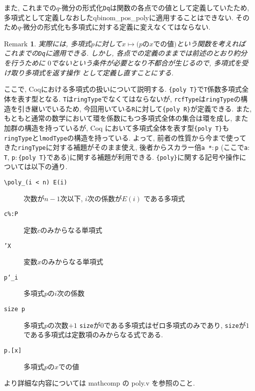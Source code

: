 \documentclass[11pt]{jsreport}
\theoremstyle{mystyle}
\newtheorem{rmk}[df]{$\textrm{Remark}$}
\newcommand{\brmk}{\begin{rmk}}
\newcommand{\ermk}{\end{rmk}}
\newcommand{\0}{\textbf{0}}
\begin{document}
また, これまでの$q$-微分の形式化{\tt Dq}は関数の各点での値として定義していたため, 多項式として定義しなおした{qbinom\_pos\_poly}に適用することはできない. そのため$q$-微分の形式化も多項式に対する定義に変えなくてはならない. 
\brmk
  実際には, 多項式$p$に対して$x \mapsto \text{($p$の$x$での値)}$という関数を考えれば
  これまでの{\tt Dq}に適用できる. しかし, 各点での定義のままでは前述のとおり約分を行うために
  $0$でないという条件が必要となり不都合が生じるので, 多項式を受け取り多項式を返す操作
  として定義し直すことにする. 
\ermk
ここで, Coqにおける多項式の扱いについて説明する. 
{\tt \{poly T\}}で{\tt T}係数多項式全体を表す型となる. {\tt T}は{\tt ringType}でなくてはならないが, {\tt rcfType}は{\tt ringType}の構造を引き継いでいるため, 今回用いている{\tt R}に対して{\tt \{poly R\}}が定義できる. 
また, もともと通常の数学において環を係数にもつ多項式全体の集合は環を成し, また加群の構造を持っているが, Coq において多項式全体を表す型{\tt \{poly T\}}も{\tt ringType}と{\tt lmodType}の構造を持っている. よって, 前者の性質から今まで使ってきた{\tt ringType}に対する補題がそのまま使え, 後者からスカラー倍{\tt a *$\colon$p} (ここで{\tt a$\colon$T}, 
{\tt p$\colon$\{poly T\}}である)に関する補題が利用できる. {\tt \{poly\}}に関する記号や操作については以下の通り. 
\begin{description}
  \item[\tt \textbackslash poly\_(i < n) E(i)] 次数が$n - 1$次以下, $i$次の係数が$E(i)$
    である多項式
  \item[\tt c\%:P] 定数$c$のみからなる単項式
  \item[\tt 'X] 変数$x$のみからなる単項式
  \item[\tt p`\_i] 多項式$p$の$i$次の係数 
  \item[\tt size p] 多項式$p$の次数$+1$
    {\tt size}が$0$である多項式はゼロ多項式のみであり, 
    {\tt size}が$1$である多項式は定数項のみからなる式である. 
  \item[{\tt p.[x]}] 多項式$p$の$x$での値 
\end{description}
より詳細な内容については mathcomp の poly.v を参照のこと. 
\end{document}
